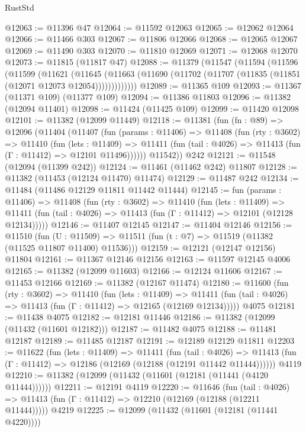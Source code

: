 \begin{lexlean}{RustStd}
\begin{coremodule}
@12063 := @11396 @47
@12064 := @11592 @12063
@12065 := @12062 @12064
@12066 := @11466 @303
@12067 := @11806 @12066
@12068 := @12065 @12067
@12069 := @11490 @303
@12070 := @11810 @12069
@12071 := @12068 @12070
@12073 := @11815 (@11817 @47)
@12088 := @11379
    (@11547
      (@11594
        (@11596
          (@11599
            (@11621
              (@11645
                (@11663 (@11690 (@11702 (@11707 (@11835 (@11851 (@12071 @12073 @12054)))))))))))))
@12089 := @11365 @109
@12093 := @11367 (@11371 @109) (@11377 @109)
@12094 := @11386 @11803
@12096 := @11382 (@12094 @11401)
@12098 := @11424 (@11425 @109)
@12099 := @11420 @12098
@12101 := @11382 (@12099 @11449)
@12118 := @11381
    (fun (fn : @89) =>
    @12096
      (@11404
        (@11407
          (fun (params : @11406) =>
          @11408
            (fun (rty : @3602) =>
            @11410
              (fun (lets : @11409) =>
              @11411 (fun (tail : @4026) => @11413 (fun (Γ : @11412) => @12101 @11496))))))
        @11542))
    @242
@12121 := @11548 (@12094 (@11399 @242))
@12124 := @11461 (@11462 @242) @11807
@12128 := @11382 (@11453 (@12124 @11470) @11474)
@12129 := @11487 @242
@12134 := @11484 (@11486 @12129 @11811 @11442 @11444)
@12145 := fun (params : @11406) =>
  @11408
    (fun (rty : @3602) =>
    @11410
      (fun (lets : @11409) =>
      @11411 (fun (tail : @4026) => @11413 (fun (Γ : @11412) => @12101 (@12128 @12134)))))
@12146 := @11407 @12145
@12147 := @11404 @12146
@12156 := @11510
    (fun (U : @11509) => @11511 (fun (t : @7) => @11519 (@11382 (@11525 @11807 @11400) @11536)))
@12159 := @12121 (@12147 @12156) @11804
@12161 := @11367 @12146 @12156
@12163 := @11597 @12145 @4006
@12165 := @11382 (@12099 @11603)
@12166 := @12124 @11606
@12167 := @11453 @12166
@12169 := @11382 (@12167 @11474)
@12180 := @11600
    (fun (rty : @3602) =>
    @11410
      (fun (lets : @11409) =>
      @11411 (fun (tail : @4026) => @11413 (fun (Γ : @11412) => @12165 (@12169 @12134)))))
    @4075
@12181 := @11438 @4075
@12182 := @12181 @11446
@12186 := @11382 (@12099 (@11432 (@11601 @12182)))
@12187 := @11482 @4075
@12188 := @11481 @12187
@12189 := @11485 @12187
@12191 := @12189 @12129 @11811
@12203 := @11622
    (fun (lets : @11409) =>
    @11411
      (fun (tail : @4026) =>
      @11413 (fun (Γ : @11412) => @12186 (@12169 (@12188 (@12191 @11442 @11444))))))
    @4119
@12210 := @11382 (@12099 (@11432 (@11601 (@12181 (@11441 (@4120 @11444))))))
@12211 := @12191 @4119
@12220 := @11646
    (fun (tail : @4026) => @11413 (fun (Γ : @11412) => @12210 (@12169 (@12188 (@12211 @11444)))))
    @4219
@12225 := @12099 (@11432 (@11601 (@12181 (@11441 @4220))))

\end{coremodule}
\end{lexlean}
